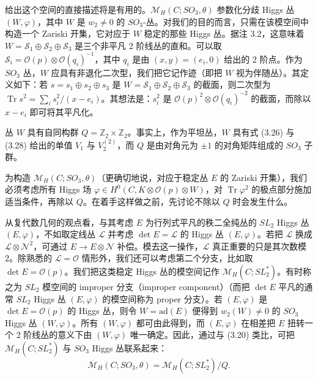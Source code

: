 \documentclass[11pt,a4paper]{article}
\newcommand{\Tr}{\operatorname{Tr}}
\begin{document}
给出这个空间的直接描述将是有用的。$\mathcal{M}_H(C;SO_3,\theta)$ 参数化分歧 Higgs 丛 $(W,\varphi)$，其中 $W$ 是 $w_2\ne0$ 的 $SO_3$-丛。对我们的目的而言，只需在该模空间中构造一个 Zariski 开集，它对应于 $W$ 稳定的那些 Higgs 丛。据注 3.2，这意味着 $W=\mathcal{S}_1\oplus\mathcal{S}_2\oplus\mathcal{S}_3$ 是三个非平凡 2 阶线丛的直和。可以取 $\mathcal{S}_i=\mathcal{O}(p)\otimes\mathcal{O}(q_i)^{-1}$，其中 $q_i$ 是由 $(x,y)=(e_i,0)$ 给出的 2 阶点。作为 $SO_3$ 丛，$W$ 应具有非退化二次型，我们把它记作迹（即把 $W$ 视为伴随丛）。其定义如下：若 $s=s_1\oplus s_2\oplus s_3$ 是 $W=\mathcal{S}_1\oplus\mathcal{S}_2\oplus\mathcal{S}_3$ 的截面，则二次型为 $\Tr s^2=\sum_i s_i^2/(x-e_i)$。其想法是：$s_i^2$ 是 $\mathcal{O}(p)^2\otimes\mathcal{O}(q_i)^{-2}$ 的截面，而除以 $x-e_i$ 即可将其平凡化。

丛 $W$ 具有自同构群 $Q=\mathbb{Z}_2\times\mathbb{Z}_2$。事实上，作为平坦丛，$W$ 具有式 (3.26) 与 (3.28) 给出的单值 $V_1$ 与 $V_2^{(2)}$，而 $Q$ 是由对角元为 $\pm1$ 的对角矩阵组成的 $SO_3$ 子群。

为构造 $\mathcal{M}_H(C;SO_3,\theta)$（更确切地说，对应于稳定丛 $E$ 的 Zariski 开集），我们必须考虑所有 Higgs 场 $\varphi\in H^0(C,K\otimes\mathcal{O}(p)\otimes W)$，对 $\Tr\varphi^2$ 的极点部分施加适当条件，再除以 $Q$。在着手这样做之前，先讨论不除以 $Q$ 时会发生什么。

从复代数几何的观点看，与其考虑 $E$ 为行列式平凡的秩二全纯丛的 $SL_2$ Higgs 丛 $(E,\varphi)$，不如取定线丛 $\mathcal{L}$ 并考虑 $\det E=\mathcal{L}$ 的 Higgs 丛 $(E,\varphi)$。若把 $\mathcal{L}$ 换成 $\mathcal{L}\otimes\mathcal{N}^2$，可通过 $E\to E\otimes\mathcal{N}$ 补偿。模去这一操作，$\mathcal{L}$ 真正重要的只是其次数模 $2$。除熟悉的 $\mathcal{L}=\mathcal{O}$ 情形外，我们还可以考虑第二个分支，比如取 $\det E=\mathcal{O}(p)$。我们把这类稳定 Higgs 丛的模空间记作 $\mathcal{M}_H(C;SL_2^*)$。有时称之为 $SL_2$ 模空间的 improper 分支（improper component）（而把 $\det E$ 平凡的通常 $SL_2$ Higgs 丛 $(E,\varphi)$ 的模空间称为 proper 分支）。若 $(E,\varphi)$ 是 $\det E=\mathcal{O}(p)$ 的 Higgs 丛，则令 $W=\mathrm{ad}(E)$ 便得到 $w_2(W)\ne0$ 的 $SO_3$ Higgs 丛 $(W,\varphi)$。所有 $(W,\varphi)$ 都可由此得到，而 $(E,\varphi)$ 在相差把 $E$ 扭转一个 2 阶线丛的意义下由 $(W,\varphi)$ 唯一确定。因此，通过与 (3.20) 类比，可把 $\mathcal{M}_H(C;SL_2^*)$ 与 $SO_3$ Higgs 丛联系起来：
\begin{equation}\tag{3.30}
\mathcal{M}_H(C;SO_3,\theta)=\mathcal{M}_H(C;SL_2^*)/Q.
\end{equation}
\end{document}
